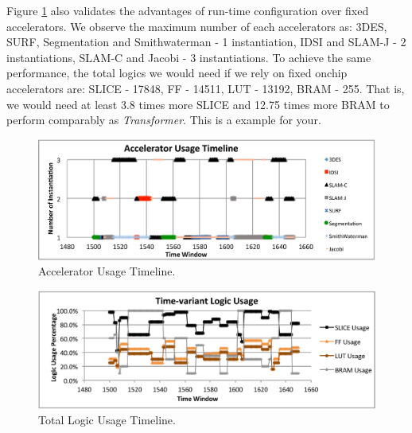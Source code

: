 Figure  \ref{fig_acc_timeline}  also validates the advantages of run-time
configuration over fixed accelerators. We observe the maximum number of each
accelerators as: 3DES, SURF, Segmentation and Smithwaterman - 1
instantiation, IDSI and SLAM-J - 2 instantiations, SLAM-C and Jacobi -
3 instantiations. To achieve the same performance, the total logics we
would need if we rely on fixed onchip accelerators are: SLICE - 17848, FF
- 14511, LUT - 13192, BRAM - 255. That is, we would need at least 3.8 times
more SLICE and 12.75 times more BRAM to perform comparably as {\em Transformer}. 
This is a example for your.


\begin{figure}[ht]
    \centering
    \includegraphics[width=6.0in]{Acc_timeline}
    \caption{Accelerator Usage Timeline.}
    \label{fig_acc_timeline}
\end{figure}

\begin{figure}[ht]
    \centering
    \includegraphics[width=6.0in]{Logic-Usage-Timeline}
    \caption{Total Logic Usage Timeline.}
    \label{fig_logic_timeline}
\end{figure}
